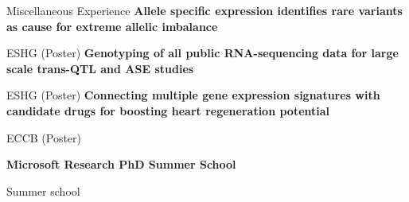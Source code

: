 \begin{rubric}{Miscellaneous Experience}
\entry*[17 June 2018] \textbf{Allele specific expression identifies rare variants as cause for extreme allelic imbalance} \par
ESHG (Poster)
%
\entry*[25 May 2016] \textbf{Genotyping of all public RNA-sequencing data for large scale trans-QTL and ASE studies} \par
ESHG (Poster)
%
\entry*[8 Sep 2014] \textbf{Connecting multiple gene expression signatures with candidate drugs for boosting heart regeneration potential} \par
ECCB (Poster)

\entry*[Jul 2016] \textbf{Microsoft Research PhD Summer School} \par
Summer school

\end{rubric}